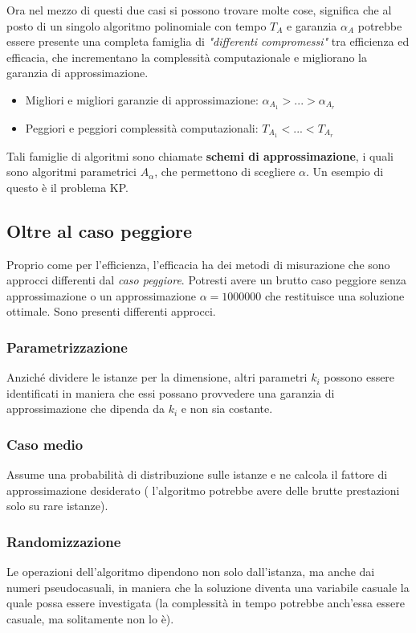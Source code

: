 \documentclass{article}
\begin{document}
Ora nel mezzo di questi due casi si possono trovare molte cose, significa che al posto di un singolo algoritmo
polinomiale con tempo $T_A$ e garanzia $\alpha_A$ potrebbe essere presente una completa
famiglia di \textit{"differenti compromessi"} tra efficienza ed efficacia, che incrementano la
complessità computazionale e migliorano la garanzia di approssimazione.

\begin{itemize}
    \item Migliori e migliori garanzie di approssimazione: $\alpha_{A_1} > ... > \alpha_{A_r}$
    \item Peggiori e peggiori complessità computazionali: $T_{A_1}<...<T_{A_r}$
\end{itemize}

Tali famiglie di algoritmi sono chiamate \textbf{schemi di approssimazione}, i quali sono algoritmi
parametrici $A_\alpha$, che permettono di scegliere $\alpha$. Un esempio di questo è il problema KP.

\subsection{Oltre al caso peggiore}
Proprio come per l'efficienza, l'efficacia ha dei metodi di misurazione che sono approcci
differenti dal \textit{caso peggiore}. Potresti avere un brutto caso peggiore senza approssimazione
o un approssimazione $\alpha=1000000$ che restituisce una soluzione ottimale. Sono presenti differenti approcci.

\subsubsection{Parametrizzazione}
Anziché dividere le istanze per la dimensione, altri parametri $k_i$ possono essere identificati in maniera che
essi possano provvedere una garanzia di approssimazione che dipenda da $k_i$ e non sia costante.

\subsubsection{Caso medio}
Assume una probabilità di distribuzione sulle istanze e ne calcola il fattore di approssimazione desiderato (
l'algoritmo potrebbe avere delle brutte prestazioni solo su rare istanze).

\subsubsection{Randomizzazione}
Le operazioni dell'algoritmo dipendono non solo dall'istanza, ma anche dai numeri pseudocasuali, in maniera
che la soluzione diventa una variabile casuale la quale possa essere investigata (la complessità in tempo
potrebbe anch'essa essere casuale, ma solitamente non lo è).
\end{document}
